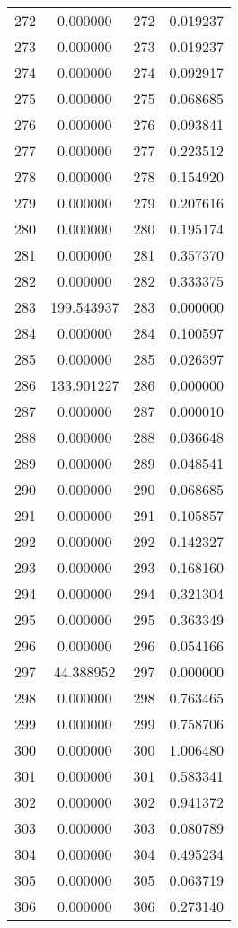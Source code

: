 \documentclass[12pt]{article}
\begin{document}
\begin{longtable}{@{}cccc@{}}
272 & 0.000000 & 272 & 0.019237 \\
273 & 0.000000 & 273 & 0.019237 \\
274 & 0.000000 & 274 & 0.092917 \\
275 & 0.000000 & 275 & 0.068685 \\
276 & 0.000000 & 276 & 0.093841 \\
277 & 0.000000 & 277 & 0.223512 \\
278 & 0.000000 & 278 & 0.154920 \\
279 & 0.000000 & 279 & 0.207616 \\
280 & 0.000000 & 280 & 0.195174 \\
281 & 0.000000 & 281 & 0.357370 \\
282 & 0.000000 & 282 & 0.333375 \\
283 & 199.543937 & 283 & 0.000000 \\
284 & 0.000000 & 284 & 0.100597 \\
285 & 0.000000 & 285 & 0.026397 \\
286 & 133.901227 & 286 & 0.000000 \\
287 & 0.000000 & 287 & 0.000010 \\
288 & 0.000000 & 288 & 0.036648 \\
289 & 0.000000 & 289 & 0.048541 \\
290 & 0.000000 & 290 & 0.068685 \\
291 & 0.000000 & 291 & 0.105857 \\
292 & 0.000000 & 292 & 0.142327 \\
293 & 0.000000 & 293 & 0.168160 \\
294 & 0.000000 & 294 & 0.321304 \\
295 & 0.000000 & 295 & 0.363349 \\
296 & 0.000000 & 296 & 0.054166 \\
297 & 44.388952 & 297 & 0.000000 \\
298 & 0.000000 & 298 & 0.763465 \\
299 & 0.000000 & 299 & 0.758706 \\
300 & 0.000000 & 300 & 1.006480 \\
301 & 0.000000 & 301 & 0.583341 \\
302 & 0.000000 & 302 & 0.941372 \\
303 & 0.000000 & 303 & 0.080789 \\
304 & 0.000000 & 304 & 0.495234 \\
305 & 0.000000 & 305 & 0.063719 \\
306 & 0.000000 & 306 & 0.273140 \\

\end{longtable}
\end{document}
